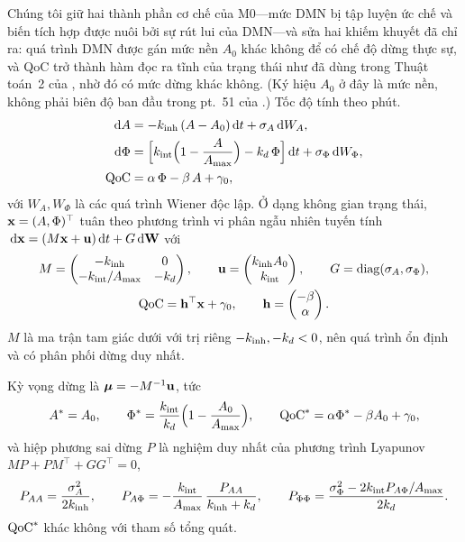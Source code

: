 Chúng tôi giữ hai thành phần cơ chế của M0---mức DMN bị tập luyện ức chế và biến tích hợp được nuôi bởi sự rút lui của DMN---và sửa hai khiếm khuyết đã chỉ ra: quá trình DMN được gán mức nền $A_0$ khác không để có chế độ dừng thực sự, và QoC trở thành hàm đọc ra tĩnh của trạng thái như đã dùng trong Thuật toán~2 của \citet{BQI}, nhờ đó có mức dừng khác không. (Ký hiệu $A_0$ ở đây là mức nền, không phải biên độ ban đầu trong pt.~51 của \citealp{BQI}.) Tốc độ tính theo phút.
\begin{align}
  \,\mathrm{d} A    &= -k_{\mathrm{inh}}\,(A-A_0)\,\mathrm{d} t + \sigma_{A}\,\mathrm{d} W_A, \label{eq:m1A}\\
  \,\mathrm{d} \Phi &= \Bigl[k_{\mathrm{int}}\Bigl(1-\frac{A}{A_{\max}}\Bigr)-k_{d}\,\Phi\Bigr]\,\mathrm{d} t + \sigma_{\Phi}\,\mathrm{d} W_\Phi, \label{eq:m1Phi}\\
  \mathrm{QoC}     &= \alpha\,\Phi-\beta\,A+\gamma_0, \label{eq:m1Q}
\end{align}
với $W_A,W_\Phi$ là các quá trình Wiener độc lập. Ở dạng không gian trạng thái, $\mathbf{x}=(A,\Phi)^\top$ tuân theo phương trình vi phân ngẫu nhiên tuyến tính $\,\mathrm{d}\mathbf{x}=(M\mathbf{x}+\mathbf{u})\,\mathrm{d} t+G\,\mathrm{d}\mathbf W$ với
\begin{equation}
\begin{gathered}
  M=\begin{pmatrix}-k_{\mathrm{inh}} & 0\\ -k_{\mathrm{int}}/A_{\max} & -k_{d}\end{pmatrix},\qquad
  \mathbf{u}=\begin{pmatrix}k_{\mathrm{inh}} A_0\\ k_{\mathrm{int}}\end{pmatrix},\qquad
  G=\operatorname{diag}(\sigma_{A},\sigma_{\Phi}),\\
  \mathrm{QoC}=\mathbf{h}^\top\mathbf{x}+\gamma_0,\qquad \mathbf{h}=\begin{pmatrix}-\beta\\ \alpha\end{pmatrix}.
\end{gathered}
  \label{eq:ss}
\end{equation}
$M$ là ma trận tam giác dưới với trị riêng $-k_{\mathrm{inh}},-k_{d}<0$, nên quá trình ổn định và có phân phối dừng duy nhất.

\begin{proposition}
\label{prop:p4}
Kỳ vọng dừng là $\boldsymbol{\mu}=-M^{-1}\mathbf{u}$, tức
\begin{equation}
  A^*=A_0,\qquad \Phi^*=\frac{k_{\mathrm{int}}}{k_{d}}\Bigl(1-\frac{A_0}{A_{\max}}\Bigr),\qquad
  \mathrm{QoC}^*=\alpha\Phi^*-\beta A_0+\gamma_0,
  \label{eq:m1ss}
\end{equation}
và hiệp phương sai dừng $P$ là nghiệm duy nhất của phương trình Lyapunov $MP+PM^\top+GG^\top=0$,
\begin{equation}
  P_{AA}=\frac{\sigma_{A}^2}{2k_{\mathrm{inh}}},\qquad
  P_{A\Phi}=-\frac{k_{\mathrm{int}}}{A_{\max}}\,\frac{P_{AA}}{k_{\mathrm{inh}}+k_{d}},\qquad
  P_{\Phi\Phi}=\frac{\sigma_{\Phi}^2-2k_{\mathrm{int}} P_{A\Phi}/A_{\max}}{2k_{d}}.
  \label{eq:P}
\end{equation}
$\mathrm{QoC}^*$ khác không với tham số tổng quát.
\end{proposition}


